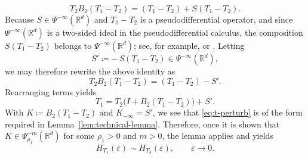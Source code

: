 \documentclass[a4paper,12pt]{article}
\newcommand{\R}{\mathbb{R}}
\begin{document}
\[
T_2 B_2 (T_1-T_2) = (T_1-T_2) + S(T_1-T_2).
\]
\fi 
Because $S\in\Psi^{-\infty}(\R^d)$ and $T_1-T_2$ is a pseudodifferential operator,
and since $\Psi^{-\infty}(\R^d)$ is a two-sided ideal in the
pseudodifferential calculus, the composition $S(T_1-T_2)$ belongs to
$\Psi^{-\infty}(\R^d)$; see, for example, \cite[Theorem~4.22]{hinzmicrolocal} or \cite[Theorem~23.6]{shubin_pseudodifferential_2001}.
Letting
\[
S' \coloneqq -\,S(T_1-T_2)\in\Psi^{-\infty}(\R^d),
\]
we may therefore rewrite the above identity as
\[
T_2 B_2 (T_1-T_2) = (T_1-T_2) - S'.
\]
Rearranging terms yields
\begin{equation}\label{eq:t-perturb}
T_1
=
T_2\bigl(I + B_2(T_1-T_2)\bigr) + S'.
\end{equation}
With $K \coloneqq B_2(T_1-T_2)$ and $K_{-\infty}=S'$, we see that
\eqref{eq:t-perturb} is of the form required in
Lemma~\ref{lem:technical-lemma}.
Therefore, once it is shown that 
$K\in\Psi^{-m}_{\rho_1}(\R^d)$ for some $\rho_1>0$ and $m>0$,
the lemma applies and yields
\begin{equation}\label{eq:equiv-invariance-quant}
    H_{T_1}(\varepsilon)\sim H_{T_2}(\varepsilon),
    \qquad \varepsilon\to0.
\end{equation}
\end{document}

